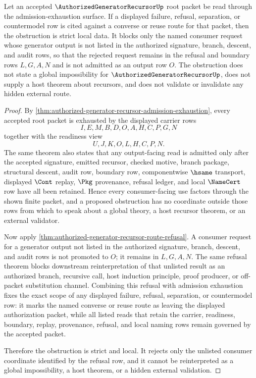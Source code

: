 \begin{corollary}
\label{cor:authorized-generator-recursor-admission-exhaustion-strict-obstruction}
Let an accepted $\AuthorizedGeneratorRecursorUp$ root packet be read through the admission-exhaustion surface. If a displayed failure, refusal, separation, or countermodel row is cited against a converse or reuse route for that packet, then the obstruction is strict local data. It blocks only the named consumer request whose generator output is not listed in the authorized signature, branch, descent, and audit rows, so that the rejected request remains in the refusal and boundary rows $L,G,A,N$ and is not admitted as an output row $O$. The obstruction does not state a global impossibility for $\AuthorizedGeneratorRecursorUp$, does not supply a host theorem about recursors, and does not validate or invalidate any hidden external route.
\end{corollary}
\begin{proof}
By \autoref{thm:authorized-generator-recursor-admission-exhaustion}, every accepted root packet is exhausted by the displayed carrier rows
$$
I,E,M,B,D,O,A,H,C,P,G,N
$$
together with the readiness view
$$
U,J,K,O,L,H,C,P,N.
$$
The same theorem also states that any output-facing read is admitted only after the accepted signature, emitted recursor, checked motive, branch package, structural descent, audit row, boundary row, componentwise $\hsame$ transport, displayed $\Cont$ replay, $\Pkg$ provenance, refusal ledger, and local $\NameCert$ row have all been retained. Hence every consumer-facing use factors through the shown finite packet, and a proposed obstruction has no coordinate outside those rows from which to speak about a global theory, a host recursor theorem, or an external validator.

Now apply \autoref{thm:authorized-generator-recursor-route-refusal}. A consumer request for a generator output not listed in the authorized signature, branch, descent, and audit rows is not promoted to $O$; it remains in $L,G,A,N$. The same refusal theorem blocks downstream reinterpretation of that unlisted result as an authorized branch, recursive call, host induction principle, proof producer, or off-packet substitution channel. Combining this refusal with admission exhaustion fixes the exact scope of any displayed failure, refusal, separation, or countermodel row: it marks the named converse or reuse route as leaving the displayed authorization packet, while all listed reads that retain the carrier, readiness, boundary, replay, provenance, refusal, and local naming rows remain governed by the accepted packet.

Therefore the obstruction is strict and local. It rejects only the unlisted consumer coordinate identified by the refusal row, and it cannot be reinterpreted as a global impossibility, a host theorem, or a hidden external validation.
\end{proof}


